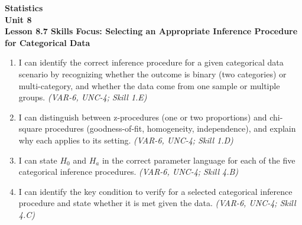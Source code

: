 \documentclass[10pt]{article}
\begin{document}
\vspace{-0.8in}

\begin{center}
  {\color{white}\textbf{\LARGE Statistics}}\\[4pt]
  {\color{skymid}\large\textbf{Unit 8}}\\[6pt]
  {\color{white}\textbf{\large Lesson 8.7 \quad Skills Focus: Selecting an Appropriate Inference Procedure for Categorical Data}}
\end{center}

\vspace{0.22in}
\namedateperiod
\vspace{0.18in}

\begin{learningtargetbox}
\small
\begin{enumerate}[leftmargin=1.5em, itemsep=5pt]
  \item I can identify the correct inference procedure for a given categorical data scenario
        by recognizing whether the outcome is binary (two categories) or multi-category, and
        whether the data come from one sample or multiple groups.
        \textit{(VAR-6, UNC-4; Skill 1.E)}
  \item I can distinguish between z-procedures (one or two proportions) and chi-square
        procedures (goodness-of-fit, homogeneity, independence), and explain why each applies
        to its setting.
        \textit{(VAR-6, UNC-4; Skill 1.D)}
  \item I can state $H_0$ and $H_a$ in the correct parameter language for each of the five
        categorical inference procedures.
        \textit{(VAR-6, UNC-4; Skill 4.B)}
  \item I can identify the key condition to verify for a selected categorical inference
        procedure and state whether it is met given the data.
        \textit{(VAR-6, UNC-4; Skill 4.C)}
\end{enumerate}
\end{learningtargetbox}

\vspace{0.14in}
\end{document}
